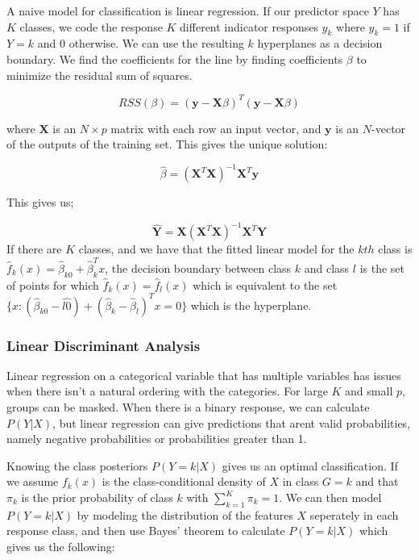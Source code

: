 \documentclass[12pt,twoside]{reedthesis}
\theoremstyle{definition}
\theoremstyle{definition}
\theoremstyle{definition}
\theoremstyle{remark}
\begin{document}
A naive model for classification is linear regression. If our predictor
space \(Y\) has \(K\) classes, we code the response \(K\) different
indicator responses \(y_k\) where \(y_k = 1\) if \(Y = k\) and 0
otherwise. We can use the resulting \(k\) hyperplanes as a decision
boundary. We find the coefficients for the line by finding coefficients
\(\beta\) to minimize the residual sum of squares.

\[ RSS(\beta) = (\textbf{y} - \textbf{X}\beta)^T(\textbf{y} - \textbf{X}\beta) \]

where \(\textbf{X}\) is an \(N\times p\) matrix with each row an input
vector, and \(\textbf{y}\) is an \(N\)-vector of the outputs of the
training set. This gives the unique solution:

\[ \hat{\beta} = (\textbf{X}^T\textbf{X})^{-1}\textbf{X}^T\textbf{y}\]

This gives us;

\[\hat{\textbf{Y}} = \textbf{X}(\textbf{X}^T\textbf{X})^{-1}\textbf{X}^T
\textbf{Y}\] If there are \(K\) classes, and we have that the fitted
linear model for the \(kth\) class is
\(\hat{f}_k(x) = \hat{\beta}_{k0} + \hat{\beta}^T_kx\), the decision
boundary between class \(k\) and class \(l\) is the set of points for
which \(\hat{f}_k(x) = \hat{f}_l(x)\) which is equivalent to the set
\(\{x: (\hat{\beta}_{k0} - \hat{l0}) + (\hat{\beta}_k - \hat{\beta}_l)^Tx = 0\}\)
which is the hyperplane.

\subsubsection{Linear Discriminant
Analysis}\label{linear-discriminant-analysis}

Linear regression on a categorical variable that has multiple variables
has issues when there isn't a natural ordering with the categories. For
large \(K\) and small \(p\), groups can be masked. When there is a
binary response, we can calculate \(P(Y|X)\), but linear regression can
give predictions that arent valid probabilities, namely negative
probabilities or probabilities greater than 1.

Knowing the class posteriors \(P(Y = k|X)\) gives us an optimal
classification. If we assume \(f_k(x)\) is the class-conditional density
of \(X\) in class \(G = k\) and that \(\pi_k\) is the prior probability
of class \(k\) with \(\sum_{k=1}^K \pi_k = 1\). We can then model
\(P(Y = k | X)\) by modeling the distribution of the features \(X\)
seperately in each response class, and then use Bayes' theorem to
calculate \(P(Y = k |X)\) which gives us the following:
\end{document}
